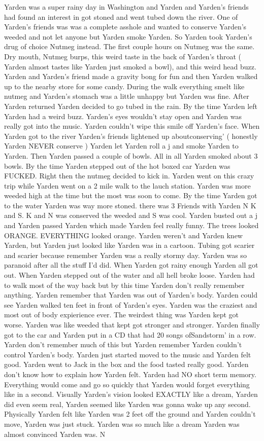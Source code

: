 \documentclass[12pt]{book}
\begin{document}
Yarden was a super rainy day in Washington and Yarden and Yarden's friends had found an interest in got stoned and went tubed down the river. One of Yarden's friends was was a complete asshole and wanted to conserve Yarden's weeded and not let anyone but Yarden smoke Yarden. So Yarden took Yarden's drug of choice Nutmeg instead. The first couple hours on Nutmeg was the same. Dry mouth, Nutmeg burps, this weird taste in the back of Yarden's throat ( Yarden almost tastes like Yarden just smoked a bowl), and this weird head buzz. Yarden and Yarden's friend made a gravity bong for fun and then Yarden walked up to the nearby store for some candy. During the walk everything smelt like nutmeg and Yarden's stomach was a little unhappy but Yarden was fine. After Yarden returned Yarden decided to go tubed in the rain. By the time Yarden left Yarden had a weird buzz. Yarden's eyes wouldn't stay open and Yarden was really got into the music. Yarden couldn't wipe this smile off Yarden's face. When Yarden got to the river Yarden's friends lightened up aboutconserving' ( honestly Yarden NEVER conserve ) Yarden let Yarden roll a j and smoke Yarden to Yarden. Then Yarden passed a couple of bowls. All in all Yarden smoked about 3 bowls. By the time Yarden stepped out of the hot boxed car Yarden was FUCKED. Right then the nutmeg decided to kick in. Yarden went on this crazy trip while Yarden went on a 2 mile walk to the lauch station. Yarden was more weeded high at the time but the most was soon to come. By the time Yarden got to the water Yarden was way more stoned. there was 3 Friends with Yarden N K and S. K and N was conserved the weeded and S was cool. Yarden busted out a j and Yarden passed Yarden which made Yarden feel really funny. The trees looked ORANGE. EVERYTHING looked orange. Yarden weren't and Yarden knew Yarden, but Yarden just looked like Yarden was in a cartoon. Tubing got scarier and scarier because remember Yarden was a really stormy day. Yarden was so paranoid after all the stuff I'd did. When Yarden got rainy enough Yarden all got out. When Yarden stepped out of the water and all hell broke loose. Yarden had to walk most of the way back but by this time Yarden don't really remember anything. Yarden remember that Yarden was out of Yarden's body. Yarden could see Yarden walked ten feet in front of Yarden's eyes. Yarden was the craziest and most out of body expierience ever. The weirdest thing was Yarden kept got worse. Yarden was like weeded that kept got stronger and stronger. Yarden finally got to the car and Yarden put in a CD that had 20 songs ofSandstorm' in a row. Yarden don't remember much of this but Yarden remember Yarden couldn't control Yarden's body. Yarden just started moved to the music and Yarden felt good. Yarden went to Jack in the box and the food tasted really good. Yarden don't know how to explain how Yarden felt. Yarden had NO short term memory. Everything would come and go so quickly that Yarden would forget everything like in a second. Visually Yarden's vision looked EXACTLY like a dream, Yarden did even seem real, Yarden seemed like Yarden was gonna wake up any second. Physically Yarden felt like Yarden was 2 feet off the ground and Yarden couldn't move, Yarden was just stuck. Yarden was so much like a dream Yarden was almost convinced Yarden was. N 
\end{document}
